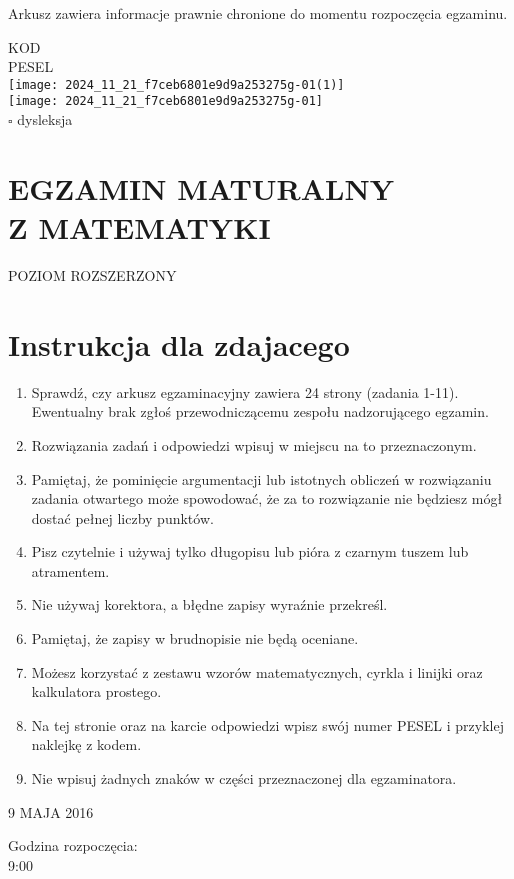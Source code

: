 \documentclass[10pt]{article}
\begin{document}
Arkusz zawiera informacje prawnie chronione do momentu rozpoczęcia egzaminu.

KOD\\
PESEL\\
\texttt{[image: 2024\_11\_21\_f7ceb6801e9d9a253275g-01(1)]}\\
\texttt{[image: 2024\_11\_21\_f7ceb6801e9d9a253275g-01]}\\
\(\square\) dysleksja

\section*{EGZAMIN MATURALNY \\
 Z MATEMATYKI}
POZIOM ROZSZERZONY

\section*{Instrukcja dla zdajacego}
\begin{enumerate}
  \item Sprawdź, czy arkusz egzaminacyjny zawiera 24 strony (zadania 1-11). Ewentualny brak zgłoś przewodniczącemu zespołu nadzorującego egzamin.
  \item Rozwiązania zadań i odpowiedzi wpisuj w miejscu na to przeznaczonym.
  \item Pamiętaj, że pominięcie argumentacji lub istotnych obliczeń w rozwiązaniu zadania otwartego może spowodować, że za to rozwiązanie nie będziesz mógł dostać pełnej liczby punktów.
  \item Pisz czytelnie i używaj tylko długopisu lub pióra z czarnym tuszem lub atramentem.
  \item Nie używaj korektora, a błędne zapisy wyraźnie przekreśl.
  \item Pamiętaj, że zapisy w brudnopisie nie będą oceniane.
  \item Możesz korzystać z zestawu wzorów matematycznych, cyrkla i linijki oraz kalkulatora prostego.
  \item Na tej stronie oraz na karcie odpowiedzi wpisz swój numer PESEL i przyklej naklejkę z kodem.
  \item Nie wpisuj żadnych znaków w części przeznaczonej dla egzaminatora.
\end{enumerate}

9 MAJA 2016

Godzina rozpoczęcia:\\
9:00
\end{document}
